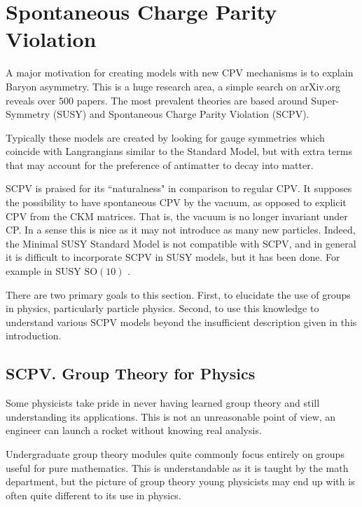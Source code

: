 \section{Spontaneous Charge Parity Violation} 
A major motivation for creating models with new CPV mechanisms is to explain Baryon asymmetry. This is a huge research area, a simple search on arXiv.org reveals over $500$ papers. The most prevalent theories are based around Super-Symmetry (SUSY) and Spontaneous Charge Parity Violation (SCPV). 

Typically these models are created by looking for gauge symmetries which coincide with Langrangians similar to the Standard Model, but with extra terms that may account for the preference of antimatter to decay into matter.  

SCPV is praised for its ``naturalness" in comparison to regular CPV\cite{SCPV1}. It supposes the possibility to have spontaneous CPV by the vacuum, as opposed to explicit CPV from the CKM matrices. That is, the vacuum is no longer invariant under CP. In a sense this is nice as it may not introduce as many new particles. Indeed, the Minimal SUSY Standard Model is not compatible with SCPV, and in general it is difficult to incorporate SCPV in SUSY models\cite{SCPV1}, but it has been done. For example in SUSY $\mathrm{SO}(10)$ \cite{SCPV2}.

There are two primary goals to this section. First, to elucidate the use of groups in physics, particularly particle physics. Second, to use this knowledge to understand various SCPV  models beyond the insufficient description given in this introduction.

\subsection{SCPV. Group Theory for Physics}
Some physicists take pride in never having learned group theory and still understanding its applications. This is not an unreasonable point of view, an engineer can launch a rocket without knowing real analysis. 

Undergraduate group theory modules quite commonly focus entirely on groups useful for pure mathematics. This is understandable as it is taught by the math department, but the picture of group theory young physicists may end up with is often quite different to its use in physics.


